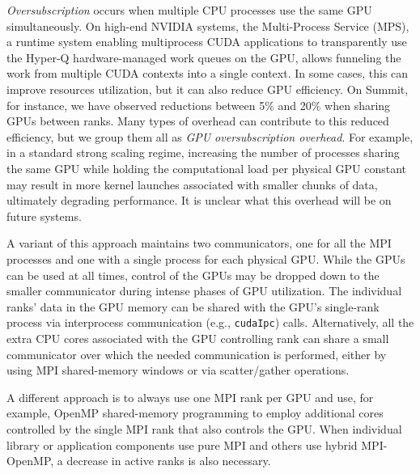 \documentclass[10pt,journal,compsoc]{IEEEtran}
\begin{document}
\emph{Oversubscription} occurs when multiple CPU
processes use the same GPU simultaneously.
On high-end NVIDIA systems, the
Multi-Process Service (MPS), a runtime system enabling multiprocess
CUDA applications to transparently use the Hyper-Q hardware-managed work queues on the GPU,
allows funneling the work from multiple CUDA contexts into a single context.
In some cases, this can improve resources utilization, but it can also reduce GPU efficiency.
On Summit, for instance,
we have observed reductions between 5\% and 20\% when sharing GPUs between ranks.
Many types of overhead can contribute to this reduced efficiency,
but we group them all as {\it GPU oversubscription overhead}.
For example, in a standard strong scaling regime, increasing the number of processes sharing the same GPU
while holding the computational load per physical GPU constant may result in more kernel launches associated with smaller
chunks of data, ultimately degrading performance.
It is unclear what this overhead will be on future systems.

A variant of this approach maintains two communicators, one for all the MPI processes and one with a single process for each physical GPU.
While the GPUs can be used
at all times, control of the GPUs may be dropped down to the smaller communicator during 
intense phases of GPU utilization. The individual ranks' data in the GPU memory can be shared with the GPU's single-rank
process via interprocess communication (e.g., {\tt cudaIpc}) calls.
Alternatively, all the extra CPU cores associated with the GPU controlling rank can share a small communicator
over which the needed communication is performed,
either by using MPI shared-memory windows or via scatter/gather operations.

A different approach is to always use one MPI rank per GPU and use, for example, OpenMP
shared-memory programming to employ additional cores controlled by the single
MPI rank that also controls the GPU.
When
individual library or application components use pure MPI and others use
hybrid MPI-OpenMP, a decrease in active ranks is also necessary.
\end{document}

